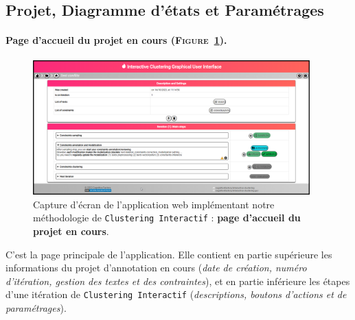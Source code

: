 	
	\newpage
	\subsection{Projet, Diagramme d'états et Paramétrages}
	\label{annex:C.2.2-DESCRIPTION-IMPLEMENTATION-INTERACTIVE-CLUSTERING-GUI-PROJET}
	
		\paragraph{Page d'accueil du projet en cours (\textsc{Figure~\ref{figure:C-WEB-APPLICATION-ACCUEIL-PROJET}}).}
			
			\begin{figure}[H]
				\centering
				\includegraphics[width=0.95\textwidth]{figures/interactive-clustering-application-accueil-projet}
				\caption{
					Capture d'écran de l'application web implémentant notre méthodologie de \texttt{Clustering Interactif} : \textbf{page d'accueil du projet en cours}.
				}
				\label{figure:C-WEB-APPLICATION-ACCUEIL-PROJET}
			\end{figure}
			
			C'est la page principale de l'application.
			Elle contient en partie supérieure les informations du projet d'annotation en cours (\textit{date de création, numéro d'itération, gestion des textes et des contraintes}), et en partie inférieure les étapes d'une itération de \texttt{Clustering Interactif} (\textit{descriptions, boutons d'actions et de paramétrages}).
			
